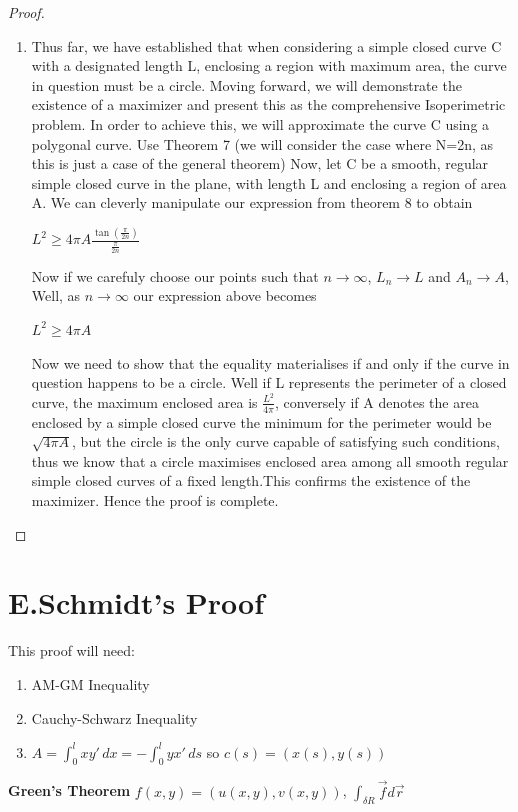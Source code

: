 \documentclass[a4paper]{book}
\begin{document}
\begin{proof}
\begin{enumerate}
        \item Thus far, we have established that when considering a simple closed curve C with a designated length L, enclosing a region with maximum area, the curve in question must be a circle. Moving forward, we will demonstrate the existence of a maximizer and present this as the comprehensive Isoperimetric problem. In order to achieve this, we will approximate the curve C using a polygonal curve. 
        Use Theorem 7 (we will consider the case where N=2n, as this is just a case of the general theorem)
        Now, let C be a smooth, regular simple closed curve in the plane, with length L and enclosing a region of area A. 
        We can cleverly manipulate our expression from theorem 8 to obtain
	\begin{center}
        $\displaystyle L^{2}\geq4\pi A \frac{\tan(\frac{\pi}{2n})}{\frac{\pi}{2n}}$
	\end{center}
        Now if we carefuly choose our points such that $n \to \infty $,  $L_{n} \to L$ and $A_{n} \to A$, 
        Well, as $n \to \infty$ our expression above becomes
	\begin{center}
        $L^{2}\geq4\pi A$
	\end{center}

        Now we need to show that the equality materialises if and only if the curve in question happens to be a circle. Well if L represents the perimeter of a closed curve, the maximum enclosed area is $\frac{L^{2}}{4\pi}$, conversely if A denotes the area enclosed by a simple closed curve the minimum for the perimeter would be $\sqrt{4 \pi A}$, but the circle is the only curve capable of satisfying such conditions, thus we know that a circle maximises enclosed area among all smooth regular simple closed curves of a fixed length.This confirms the existence of the maximizer. Hence the proof is complete.  
    \end{enumerate}
\end{proof}

\section{E.Schmidt's Proof}
This proof will need:
\begin{enumerate}
	\item AM-GM Inequality 
	\item Cauchy-Schwarz Inequality
	\item $A=\int_{0}^{l} xy' \,dx = -\int_{0}^{l} yx' \,ds$ so $c(s)=(x(s),y(s))$
\end{enumerate}
\textbf{Green's Theorem} $f(x,y)=(u(x,y),v(x,y))$, $\int_{\delta R}\overrightarrow{f} d\overrightarrow{r}$
\end{document}
